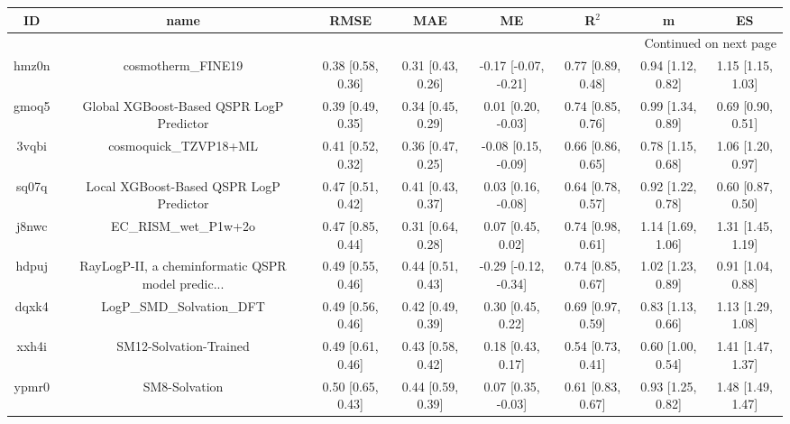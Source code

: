 \documentclass{article}
\begin{document}
\begin{center}
\begin{longtable}{|cccccccc|}
\toprule
    ID &                                               name &               RMSE &                MAE &                    ME &              R$^2$ &                     m &                    ES \\
\midrule
\endhead
\midrule
\multicolumn{8}{r}{{Continued on next page}} \\
\midrule
\endfoot

\bottomrule
\endlastfoot
 hmz0n &                                 cosmotherm\_FINE19 &  0.38 [0.58, 0.36] &  0.31 [0.43, 0.26] &  -0.17 [-0.07, -0.21] &  0.77 [0.89, 0.48] &     0.94 [1.12, 0.82] &     1.15 [1.15, 1.03] \\
 gmoq5 &           Global XGBoost-Based QSPR LogP Predictor &  0.39 [0.49, 0.35] &  0.34 [0.45, 0.29] &    0.01 [0.20, -0.03] &  0.74 [0.85, 0.76] &     0.99 [1.34, 0.89] &     0.69 [0.90, 0.51] \\
 3vqbi &                              cosmoquick\_TZVP18+ML &  0.41 [0.52, 0.32] &  0.36 [0.47, 0.25] &   -0.08 [0.15, -0.09] &  0.66 [0.86, 0.65] &     0.78 [1.15, 0.68] &     1.06 [1.20, 0.97] \\
 sq07q &            Local XGBoost-Based QSPR LogP Predictor &  0.47 [0.51, 0.42] &  0.41 [0.43, 0.37] &    0.03 [0.16, -0.08] &  0.64 [0.78, 0.57] &     0.92 [1.22, 0.78] &     0.60 [0.87, 0.50] \\
 j8nwc &                              EC\_RISM\_wet\_P1w+2o &  0.47 [0.85, 0.44] &  0.31 [0.64, 0.28] &     0.07 [0.45, 0.02] &  0.74 [0.98, 0.61] &     1.14 [1.69, 1.06] &     1.31 [1.45, 1.19] \\
 hdpuj &  RayLogP-II, a cheminformatic QSPR model predic... &  0.49 [0.55, 0.46] &  0.44 [0.51, 0.43] &  -0.29 [-0.12, -0.34] &  0.74 [0.85, 0.67] &     1.02 [1.23, 0.89] &     0.91 [1.04, 0.88] \\
 dqxk4 &                          LogP\_SMD\_Solvation\_DFT &  0.49 [0.56, 0.46] &  0.42 [0.49, 0.39] &     0.30 [0.45, 0.22] &  0.69 [0.97, 0.59] &     0.83 [1.13, 0.66] &     1.13 [1.29, 1.08] \\
 xxh4i &                             SM12-Solvation-Trained &  0.49 [0.61, 0.46] &  0.43 [0.58, 0.42] &     0.18 [0.43, 0.17] &  0.54 [0.73, 0.41] &     0.60 [1.00, 0.54] &     1.41 [1.47, 1.37] \\
 ypmr0 &                                      SM8-Solvation &  0.50 [0.65, 0.43] &  0.44 [0.59, 0.39] &    0.07 [0.35, -0.03] &  0.61 [0.83, 0.67] &     0.93 [1.25, 0.82] &     1.48 [1.49, 1.47] \\

\end{longtable}
\end{center}
\end{document}
